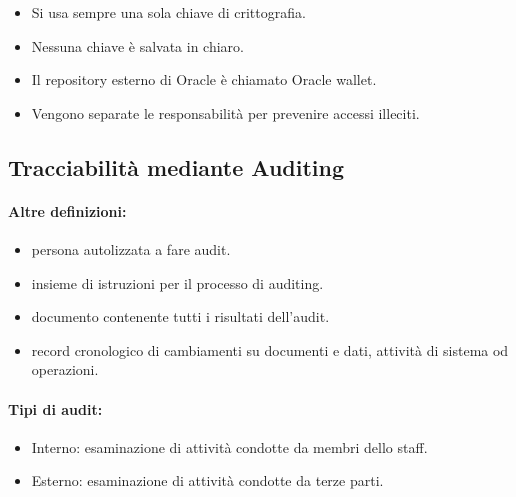 \begin{itemize}
  \item Si usa sempre una sola chiave di crittografia. 
  \item Nessuna chiave è salvata in chiaro. 
  \item Il repository esterno di Oracle è chiamato Oracle wallet. 
  \item Vengono separate le responsabilità per prevenire accessi illeciti.
\end{itemize}

\subsection{Tracciabilità mediante Auditing}




\paragraph{Altre definizioni:}

\begin{itemize}
  \item {} persona autolizzata a fare audit. 
  \item {} insieme di istruzioni per il processo di auditing. 
  \item {} documento contenente tutti i risultati dell'audit.
  \item {} record cronologico di cambiamenti su documenti e dati, attività di sistema od operazioni.
\end{itemize}

\paragraph{Tipi di audit:}

\begin{itemize}
  \item Interno: esaminazione di attività condotte da membri dello staff. 
  \item Esterno: esaminazione di attività condotte da terze parti.
\end{itemize}


